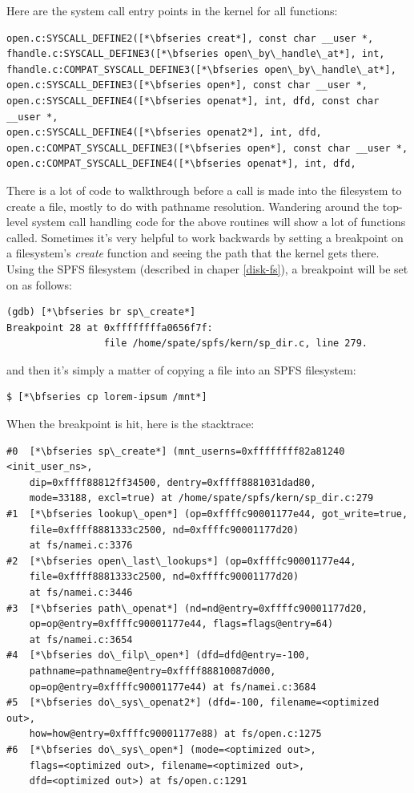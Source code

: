 Here are the system call entry points in the kernel for all functions:

\begin{lstlisting}
open.c:SYSCALL_DEFINE2([*\bfseries creat*], const char __user *, 
fhandle.c:SYSCALL_DEFINE3([*\bfseries open\_by\_handle\_at*], int, 
fhandle.c:COMPAT_SYSCALL_DEFINE3([*\bfseries open\_by\_handle\_at*], 
open.c:SYSCALL_DEFINE3([*\bfseries open*], const char __user *,
open.c:SYSCALL_DEFINE4([*\bfseries openat*], int, dfd, const char __user *,
open.c:SYSCALL_DEFINE4([*\bfseries openat2*], int, dfd, 
open.c:COMPAT_SYSCALL_DEFINE3([*\bfseries open*], const char __user *,
open.c:COMPAT_SYSCALL_DEFINE4([*\bfseries openat*], int, dfd,
\end{lstlisting}

\noindent
There is a lot of code to walkthrough before a call is made into the filesystem to create a file, mostly to do with pathname resolution. Wandering around the top-level system call handling code for the above routines will show a lot of functions called. Sometimes it's very helpful to work backwards by setting a breakpoint on a filesystem's \textit{create} function and seeing the path that the kernel gets there. Using the SPFS filesystem (described in chaper \ref{disk-fs}), a breakpoint will be set on  as follows:

\begin{lstlisting}
(gdb) [*\bfseries br sp\_create*]
Breakpoint 28 at 0xffffffffa0656f7f: 
                 file /home/spate/spfs/kern/sp_dir.c, line 279.
\end{lstlisting}

\noindent
and then it's simply a matter of copying a file into an SPFS filesystem:

\begin{lstlisting}
$ [*\bfseries cp lorem-ipsum /mnt*]
\end{lstlisting}

\noindent
When the breakpoint is hit, here is the stacktrace:

\begin{lstlisting}
#0  [*\bfseries sp\_create*] (mnt_userns=0xffffffff82a81240 <init_user_ns>, 
    dip=0xffff88812ff34500, dentry=0xffff8881031dad80, 
    mode=33188, excl=true) at /home/spate/spfs/kern/sp_dir.c:279
#1  [*\bfseries lookup\_open*] (op=0xffffc90001177e44, got_write=true, 
    file=0xffff8881333c2500, nd=0xffffc90001177d20) 
    at fs/namei.c:3376
#2  [*\bfseries open\_last\_lookups*] (op=0xffffc90001177e44, 
    file=0xffff8881333c2500, nd=0xffffc90001177d20) 
    at fs/namei.c:3446
#3  [*\bfseries path\_openat*] (nd=nd@entry=0xffffc90001177d20, 
    op=op@entry=0xffffc90001177e44, flags=flags@entry=64) 
    at fs/namei.c:3654
#4  [*\bfseries do\_filp\_open*] (dfd=dfd@entry=-100, 
    pathname=pathname@entry=0xffff88810087d000, 
    op=op@entry=0xffffc90001177e44) at fs/namei.c:3684
#5  [*\bfseries do\_sys\_openat2*] (dfd=-100, filename=<optimized out>, 
    how=how@entry=0xffffc90001177e88) at fs/open.c:1275
#6  [*\bfseries do\_sys\_open*] (mode=<optimized out>, 
    flags=<optimized out>, filename=<optimized out>, 
    dfd=<optimized out>) at fs/open.c:1291
\end{lstlisting}

